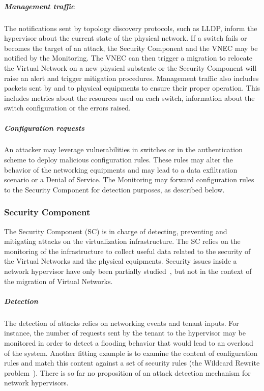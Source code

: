 \subparagraph{Management traffic} 
The notifications sent by topology discovery protocols, such as LLDP, inform the hypervisor about the current state of the physical network. If a switch fails or becomes the target of an attack, the Security Component and the VNEC may be notified by the Monitoring.
The VNEC can then trigger a migration to relocate the Virtual Network on a new physical substrate or the Security Component will raise an alert and trigger mitigation procedures.
Management traffic also includes packets sent by and to physical equipments to ensure their proper operation.
This includes metrics about the resources used on each switch, information about the switch configuration or the errors raised.

\subparagraph{Configuration requests} An attacker may leverage vulnerabilities in switches or in the authentication scheme to deploy malicious configuration rules. These rules may alter the behavior of the networking equipments and may lead to a data exfiltration scenario or a Denial of Service.
The Monitoring may forward configuration rules to the Security Component for detection purposes, as described below.

\subsubsection{Security Component}
The Security Component (SC) is in charge of detecting, preventing and mitigating attacks on the virtualization infrastructure. The SC relies on the monitoring of the infrastructure to collect useful data related to the security of the Virtual Networks and the physical equipments.
Security issues inside a network hypervisor have only been partially studied~\cite{Costa2015}, but not in the context of the migration of Virtual Networks.

\subparagraph{Detection}
The detection of attacks relies on networking events and tenant inputs.
For instance, the number of requests sent by the tenant to the hypervisor may be monitored in order to detect a flooding behavior that would lead to an overload of the system. Another fitting example is to examine the content of configuration rules and match this content against a set of security rules (\eg the Wildcard Rewrite problem~\cite{Costa2015}).
There is so far no proposition of an attack detection mechanism for network hypervisors.

